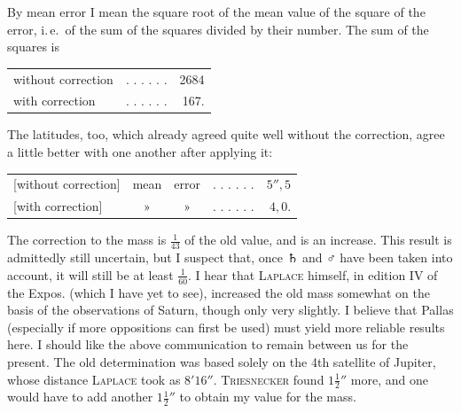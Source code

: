 \par By mean error I mean the square root of the mean value of the square of the error, i.\,e.\ of the sum of the squares divided by their number. The sum of the squares is
\begin{center}
\begin{tabular}{@{}lcr@{}}
without correction&. . . . . .&2684\\
with correction&. . . . . .&167.
\end{tabular}
\end{center}
\par The latitudes, too, which already agreed quite well without the correction, agree a little better with one another after applying it:
\begin{center}
\begin{tabular}{@{}lcccr@{}}
[without correction]&mean&error&. . . . . .&\(5''{,}5\)\\
{}[with correction]&»&»&. . . . . .&\(4{,}0\).
\end{tabular}
\end{center}
\par The correction to the mass is \(\frac{1}{43}\) of the old value, and is an increase. This result is admittedly still uncertain, but I suspect that, once {\AstroSymbols ♄} and {\AstroSymbols ♂} have been taken into account, it will still be at least \(\frac{1}{60}\). I hear that \textsc{Laplace} himself, in edition IV of the Expos. (which I have yet to see), increased the old mass somewhat on the basis of the observations of Saturn, though only very slightly. I believe that Pallas (especially if more oppositions can first be used) must yield more reliable results here. I should like the above communication to remain between us for the present. The old determination was based solely on the 4th satellite of Jupiter, whose distance \textsc{Laplace} took as \(8'16''\). \textsc{Triesnecker} found \(1\frac{1}{2}''\) more, and one would have to add another \(1\frac{1}{2}''\) to obtain my value for the mass.
\par
